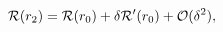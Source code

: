 \begin{equation}
{\cal R}(r_{2})={\cal R}(r_{0})+\delta {\cal R'} (r_{0})+{\cal
O}(\delta^2) ,
\end{equation}

